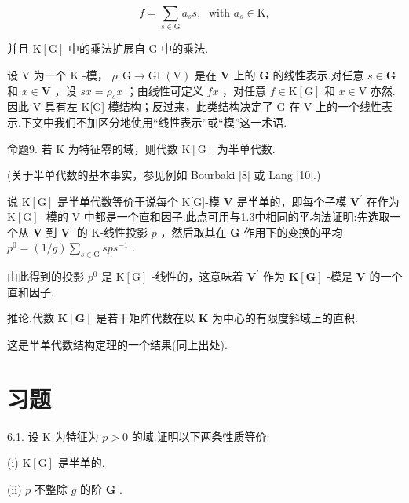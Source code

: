 \documentclass[10pt]{article}
\begin{document}
\[
f = \mathop{\sum }\limits_{{s \in  \mathrm{G}}}{a}_{s}s,\;\text{ with }{a}_{s} \in  \mathrm{K},
\]

并且 \(\mathrm{K}\left\lbrack  \mathrm{G}\right\rbrack\) 中的乘法扩展自 \(\mathrm{G}\) 中的乘法.

设 \(\mathrm{V}\) 为一个 \(\mathrm{K}\) -模， \(\rho  : \mathrm{G} \rightarrow  \mathrm{{GL}}\left( \mathrm{V}\right)\) 是在 \(\mathbf{V}\) 上的 \(\mathbf{G}\) 的线性表示.对任意 \(s \in  \mathbf{G}\) 和 \(x \in  \mathbf{V}\) ，设 \({sx} = {\rho }_{s}x\) ；由线性可定义 \({fx}\) ，对任意 \(f \in  \mathrm{K}\left\lbrack  \mathrm{G}\right\rbrack\) 和 \(x \in  \mathrm{V}\) 亦然.因此 \(\mathrm{V}\) 具有左 K[G]-模结构；反过来，此类结构决定了 G 在 V 上的一个线性表示.下文中我们不加区分地使用“线性表示”或“模”这一术语.

命题9. 若 \(\mathrm{K}\) 为特征零的域，则代数 \(\mathrm{K}\left\lbrack  \mathrm{G}\right\rbrack\) 为半单代数.

(关于半单代数的基本事实，参见例如 Bourbaki [8] 或 Lang [10].)

说 \(\mathrm{K}\left\lbrack  \mathrm{G}\right\rbrack\) 是半单代数等价于说每个 K[G]-模 \(\mathbf{V}\) 是半单的，即每个子模 \({\mathbf{V}}^{\prime }\) 在作为 \(\mathrm{K}\left\lbrack  \mathrm{G}\right\rbrack\) -模的 \(\mathrm{V}\) 中都是一个直和因子.此点可用与1.3中相同的平均法证明:先选取一个从 \(\mathbf{V}\) 到 \({\mathbf{V}}^{\prime }\) 的 K-线性投影 \(p\) ，然后取其在 \(\mathbf{G}\) 作用下的变换的平均 \({p}^{0} = \left( {1/g}\right) \mathop{\sum }\limits_{{s \in  \mathrm{G}}}{sp}{s}^{-1}\) .

由此得到的投影 \({p}^{0}\) 是 \(\mathrm{K}\left\lbrack  \mathrm{G}\right\rbrack\) -线性的，这意味着 \({\mathbf{V}}^{\prime }\) 作为 \(\mathbf{K}\left\lbrack  \mathbf{G}\right\rbrack\) -模是 \(\mathbf{V}\) 的一个直和因子.

推论.代数 \(\mathbf{K}\left\lbrack  \mathbf{G}\right\rbrack\) 是若干矩阵代数在以 \(\mathbf{K}\) 为中心的有限度斜域上的直积.

这是半单代数结构定理的一个结果(同上出处).

\section*{习题}

6.1. 设 \(\mathrm{K}\) 为特征为 \(p > 0\) 的域.证明以下两条性质等价:

(i) \(\mathrm{K}\left\lbrack  \mathrm{G}\right\rbrack\) 是半单的.

(ii) \(p\) 不整除 \(g\) 的阶 \(\mathbf{G}\) .
\end{document}
